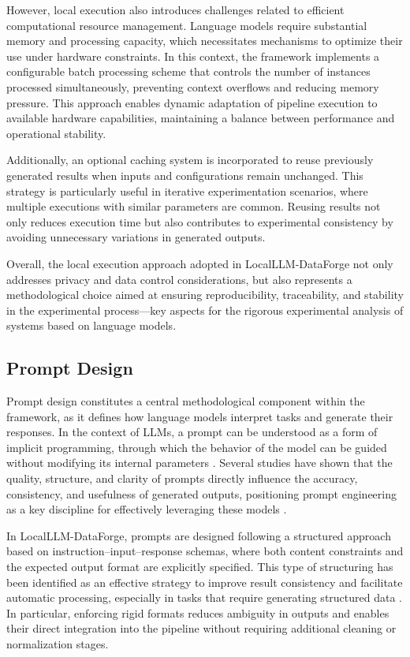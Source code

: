 \documentclass[pdflatex,sn-mathphys-num]{sn-jnl}
\theoremstyle{thmstyleone}%
\theoremstyle{thmstyletwo}%
\theoremstyle{thmstylethree}%
\begin{document}
However, local execution also introduces challenges related to efficient computational resource management. Language models require substantial memory and processing capacity, which necessitates mechanisms to optimize their use under hardware constraints. In this context, the framework implements a configurable batch processing scheme that controls the number of instances processed simultaneously, preventing context overflows and reducing memory pressure. This approach enables dynamic adaptation of pipeline execution to available hardware capabilities, maintaining a balance between performance and operational stability.

Additionally, an optional caching system is incorporated to reuse previously generated results when inputs and configurations remain unchanged. This strategy is particularly useful in iterative experimentation scenarios, where multiple executions with similar parameters are common. Reusing results not only reduces execution time but also contributes to experimental consistency by avoiding unnecessary variations in generated outputs.

Overall, the local execution approach adopted in LocalLLM-DataForge not only addresses privacy and data control considerations, but also represents a methodological choice aimed at ensuring reproducibility, traceability, and stability in the experimental process—key aspects for the rigorous experimental analysis of systems based on language models.

\subsection{Prompt Design}

Prompt design constitutes a central methodological component within the framework, as it defines how language models interpret tasks and generate their responses. In the context of LLMs, a prompt can be understood as a form of implicit programming, through which the behavior of the model can be guided without modifying its internal parameters \cite{prompt_survey}. Several studies have shown that the quality, structure, and clarity of prompts directly influence the accuracy, consistency, and usefulness of generated outputs, positioning prompt engineering as a key discipline for effectively leveraging these models \cite{prompt_engineering_review}.

In LocalLLM-DataForge, prompts are designed following a structured approach based on instruction–input–response schemas, where both content constraints and the expected output format are explicitly specified. This type of structuring has been identified as an effective strategy to improve result consistency and facilitate automatic processing, especially in tasks that require generating structured data \cite{structured_prompting}. In particular, enforcing rigid formats reduces ambiguity in outputs and enables their direct integration into the pipeline without requiring additional cleaning or normalization stages.
\end{document}
